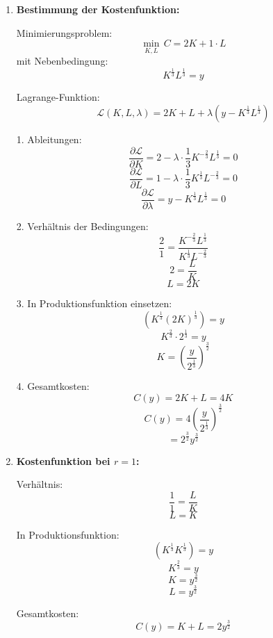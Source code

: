 \begin{solution}
	\begin{enumerate}
		\item \textbf{Bestimmung der Kostenfunktion:}

		      Minimierungsproblem:
		      \[
			      \min_{K, L} \, C = 2K + 1 \cdot L
		      \]
		      mit Nebenbedingung:
		      \[
			      K^{\frac{1}{3}} L^{\frac{1}{3}} = y
		      \]

		      Lagrange-Funktion:
		      \[
			      \mathcal{L}(K, L, \lambda) = 2K + L + \lambda \left( y - K^{\frac{1}{3}} L^{\frac{1}{3}} \right)
		      \]

		      1. Ableitungen:
		      \[
			      \frac{\partial \mathcal{L}}{\partial K} = 2 - \lambda \cdot \frac{1}{3} K^{-\frac{2}{3}} L^{\frac{1}{3}} = 0
		      \]
		      \[
			      \frac{\partial \mathcal{L}}{\partial L} = 1 - \lambda \cdot \frac{1}{3} K^{\frac{1}{3}} L^{-\frac{2}{3}} = 0
		      \]
		      \[
			      \frac{\partial \mathcal{L}}{\partial \lambda} = y - K^{\frac{1}{3}} L^{\frac{1}{3}} = 0
		      \]

		      2. Verhältnis der Bedingungen:
		      \[
			      \frac{2}{1} = \frac{K^{-\frac{2}{3}} L^{\frac{1}{3}}}{K^{\frac{1}{3}} L^{-\frac{2}{3}}}
		      \]
		      \[
			      2 = \frac{L}{K}
		      \]
		      \[
			      L = 2K
		      \]

		      3. In Produktionsfunktion einsetzen:
		      \[
			      (K^{\frac{1}{3}} (2K)^{\frac{1}{3}}) = y
		      \]
		      \[
			      K^{\frac{2}{3}} \cdot 2^{\frac{1}{3}} = y
		      \]
		      \[
			      K = \left( \frac{y}{2^{\frac{1}{3}}} \right)^{\frac{3}{2}}
		      \]

		      4. Gesamtkosten:
		      \[
			      C(y) = 2K + L = 4K
		      \]
		      \[
			      C(y) = 4 \left( \frac{y}{2^{\frac{1}{3}}} \right)^{\frac{3}{2}}
		      \]
		      \[
			      = 2^{\frac{3}{2}} y^{\frac{3}{2}}
		      \]

		\item \textbf{Kostenfunktion bei \( r = 1 \):}

		      Verhältnis:
		      \[
			      \frac{1}{1} = \frac{L}{K}
		      \]
		      \[
			      L = K
		      \]

		      In Produktionsfunktion:
		      \[
			      (K^{\frac{1}{3}} K^{\frac{1}{3}}) = y
		      \]
		      \[
			      K^{\frac{2}{3}} = y
		      \]
		      \[
			      K = y^{\frac{3}{2}}
		      \]
		      \[
			      L = y^{\frac{3}{2}}
		      \]

		      Gesamtkosten:
		      \[
			      C(y) = K + L = 2 y^{\frac{3}{2}}
		      \]


\end{enumerate}
\end{solution}

